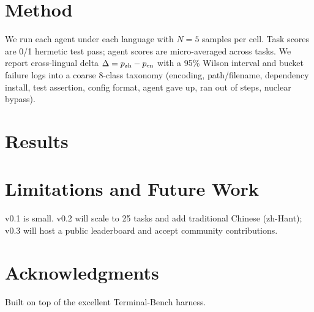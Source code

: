 \documentclass{article}
\begin{document}
\section{Method}
We run each agent under each language with $N=5$ samples per cell. Task scores
are 0/1 hermetic test pass; agent scores are micro-averaged across tasks.
We report cross-lingual delta $\Delta=p_{\rm zh}-p_{\rm en}$ with a 95\% Wilson interval
and bucket failure logs into a coarse 8-class taxonomy
(encoding, path/filename, dependency install, test assertion, config format,
agent gave up, ran out of steps, nuclear bypass).



\section{Results}

\section{Limitations and Future Work}
v0.1 is small. v0.2 will scale to 25 tasks and add traditional Chinese (zh-Hant);
v0.3 will host a public leaderboard and accept community contributions.

\section*{Acknowledgments}
Built on top of the excellent Terminal-Bench harness.



\end{document}
